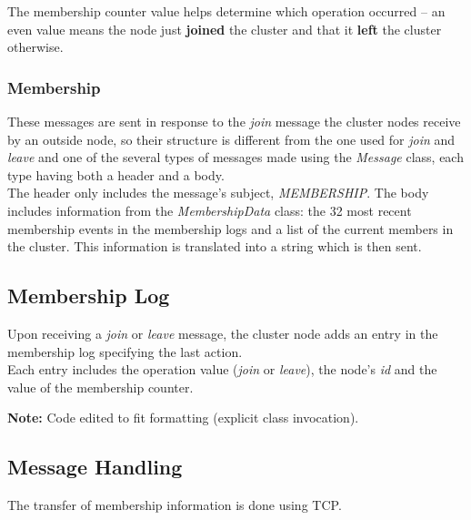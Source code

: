 \documentclass{article}
\begin{document}
\begin{multicols}{2}
	The membership counter value helps determine which operation occurred – an even value means the node just \textbf{joined} the cluster and that it \textbf{left} the cluster otherwise.

	\subsubsection{Membership}
	These messages are sent in response to the \textit{join} message the cluster nodes receive by an outside node, so their structure is different from the one used for \textit{join} and \textit{leave} and one of the several types of messages made using the \textit{Message} class, each type having both a header and a body.\\
	
	The header only includes the message’s subject, \textit{MEMBERSHIP}. The body includes information from the \textit{MembershipData} class: the 32 most recent membership events in the membership logs and a list of the current members in the cluster. This information is translated into a string which is then sent.

	\subsection{Membership Log}
	Upon receiving a \textit{join} or \textit{leave} message, the cluster node adds an entry in the membership log specifying the last action.\\
	
	Each entry includes the operation value (\textit{join} or \textit{leave}), the node’s \textit{id} and the value of the membership counter.

	
    \textbf{Note:}{ Code edited to fit formatting (explicit class invocation).}

	\subsection{Message Handling}
	The transfer of membership information is done using TCP. \\
	

\end{multicols}
\end{document}
